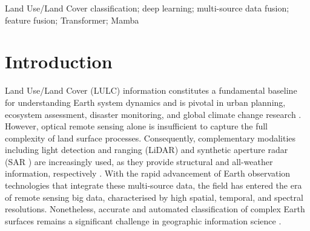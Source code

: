 \documentclass[]{interact}
\theoremstyle{plain}%
\theoremstyle{definition}
\theoremstyle{remark}
\DeclareRobustCommand{\DIFadd}[1]{{\protect\color{DIFaddcolor}\uwave{#1}}}
\DeclareRobustCommand{\DIFdel}[1]{{\protect\color{DIFdelcolor}\sout{#1}}}
\def\DIFadd#1{#1}%
\def\DIFdel#1{}%
\begin{document}
\begin{keywords}
Land Use/Land Cover\DIFdel{,} \DIFdel{Deep} \DIFdel{Learning}\DIFdel{,} \DIFdel{Multi-source} \DIFdel{Data} \DIFdel{Fusion}\DIFdel{,} \DIFdel{Feature} \DIFdel{Fusion}\DIFdel{,} \DIFadd{classification}\DIFadd{;} \DIFadd{deep} \DIFadd{learning}\DIFadd{;} \DIFadd{multi-source} \DIFadd{data} \DIFadd{fusion}\DIFadd{;} \DIFadd{feature} \DIFadd{fusion}\DIFadd{;} Transformer\DIFdel{,}\DIFadd{;} Mamba
\end{keywords}


\section{Introduction}

\DIFdel{Land-use} \DIFdel{and} \DIFdel{land-cover}

\DIFadd{Land} \DIFadd{Use}\DIFadd{/}\DIFadd{Land} \DIFadd{Cover} (LULC) information constitutes a fundamental baseline for understanding Earth system dynamics and is pivotal in urban planning, ecosystem assessment, disaster monitoring, and global climate change research {\hypersetup{citecolor=red}\color{red}\citep{ORIG1}} {\color{blue}\citep{1}}. However, optical remote sensing alone is insufficient to capture the full complexity of land surface processes. Consequently, complementary modalities including \DIFadd{light} \DIFadd{detection} \DIFadd{and} \DIFadd{ranging} \DIFadd{(}LiDAR\DIFdel{,}\DIFadd{)} \DIFadd{and} \DIFadd{synthetic} \DIFadd{aperture} \DIFadd{radar} \DIFadd{(}SAR\DIFdel{,} \DIFdel{and} \DIFdel{GNSS}\DIFadd{)} are increasingly \DIFdel{essential} \DIFadd{used}, as they provide \DIFdel{unique} structural \DIFadd{and} \DIFadd{all-weather} \DIFadd{information}, \DIFdel{temporal}\DIFdel{,} \DIFdel{and} \DIFdel{positional} \DIFdel{information} \DIFadd{respectively} {\color{blue}\citep{6}}. With the rapid advancement of Earth observation technologies that integrate these multi-source data, the field has entered the era of remote sensing big data, \DIFdel{characterized} \DIFadd{characterised} by high spatial, temporal, and \DIFdel{hyperspectral} \DIFadd{spectral} resolutions. Nonetheless, accurate and automated classification of complex Earth \DIFdel{surface} \DIFdel{dynamics} \DIFadd{surfaces} remains a significant challenge in geographic information science {\color{blue}\citep{56}}.
\end{document}
